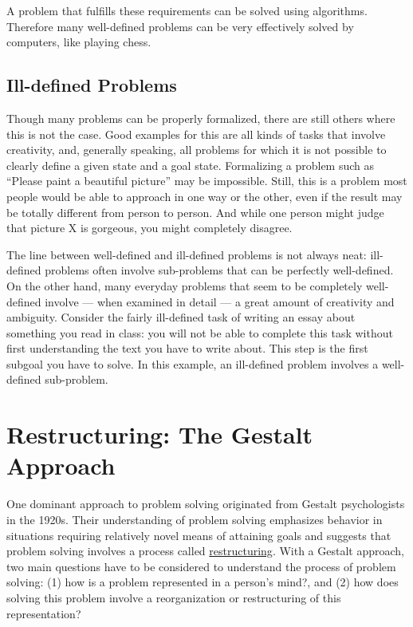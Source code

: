 \documentclass[
]{krantz}
\begin{document}
A problem that fulfills these requirements can be solved using algorithms. Therefore many well-defined problems can be very effectively solved by computers, like playing chess.

\subsection*{Ill-defined Problems}\label{ill-defined-problems}


Though many problems can be properly formalized, there are still others where this is not the case. Good examples for this are all kinds of tasks that involve creativity, and, generally speaking, all problems for which it is not possible to clearly define a given state and a goal state. Formalizing a problem such as ``Please paint a beautiful picture'' may be impossible. Still, this is a problem most people would be able to approach in one way or the other, even if the result may be totally different from person to person. And while one person might judge that picture X is gorgeous, you might completely disagree.

The line between well-defined and ill-defined problems is not always neat: ill-defined problems often involve sub-problems that can be perfectly well-defined. On the other hand, many everyday problems that seem to be completely well-defined involve --- when examined in detail --- a great amount of creativity and ambiguity. Consider the fairly ill-defined task of writing an essay about something you read in class: you will not be able to complete this task without first understanding the text you have to write about. This step is the first subgoal you have to solve. In this example, an ill-defined problem involves a well-defined sub-problem.

\section{Restructuring: The Gestalt Approach}\label{restructuring-the-gestalt-approach}

One dominant approach to problem solving originated from Gestalt psychologists in the 1920s. Their understanding of problem solving emphasizes behavior in situations requiring relatively novel means of attaining goals and suggests that problem solving involves a process called \hyperref[restructuring]{restructuring}. With a Gestalt approach, two main questions have to be considered to understand the process of problem solving: (1) how is a problem represented in a person's mind?, and (2) how does solving this problem involve a reorganization or restructuring of this representation?
\end{document}
